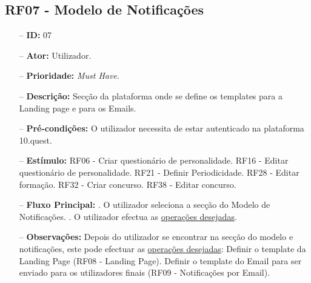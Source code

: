 \subsection{RF07 - Modelo de Notificações}
\begin{itemize}
	\item[--] \textbf{ID:} 07
	\item[--]  \textbf{Ator:} Utilizador.
	\item[--]  \textbf{Prioridade:} \textit{Must Have}.
	\item[--]  \textbf{Descrição:} Secção da plataforma onde se define os templates para a Landing page e para os Emails.
	\item[--]  \textbf{Pré-condições:} O utilizador necessita de estar autenticado na plataforma 10.quest.
	\item[--]  \textbf{Estímulo:}  
		\subitem RF06 - Criar questionário de personalidade.
		\subitem RF16 - Editar questionário de personalidade.
		\subitem RF21 - Definir Periodicidade.
		\subitem RF28 - Editar formação.
		\subitem RF32 - Criar concurso.
		\subitem RF38 - Editar concurso.
	\item[--]  \textbf{Fluxo Principal:} 
		. O utilizador seleciona a secção do Modelo de Notificações.
		. O utilizador efectua as \underline{operações desejadas}.
	\item[--]  \textbf{Observações:} Depois do utilizador se encontrar na secção do modelo e notificações, este pode efectuar as \underline{operações desejadas}:
		\subitem Definir o template da Landing Page (RF08 - Landing Page).
		\subitem Definir o template do Email para ser enviado para os utilizadores finais (RF09 - Notificações por Email).
\end{itemize}
\newpage

